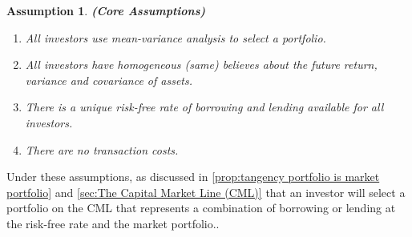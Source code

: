 \documentclass[13pt]{article}
\newtheorem{assumption}[theorem]{Assumption}
\theoremstyle{definition}
\theoremstyle{remark}
\begin{document}
\begin{assumption}
    \textbf{(Core Assumptions)} \begin{enumerate}[label=(\alph*)]
        \item All investors use mean-variance analysis to select a portfolio.
        \item All investors have homogeneous (same) believes about the future return, variance and covariance of assets.
        \item There is a unique risk-free rate of borrowing and lending available for all investors.
        \item There are no transaction costs.
    \end{enumerate}
\end{assumption}
Under these assumptions, as discussed in \cref{prop:tangency portfolio is market portfolio} and \cref{sec:The Capital Market Line (CML)} that an investor will select a portfolio on the CML that represents a combination of
borrowing or lending at the risk-free rate and the market portfolio..
\end{document}
